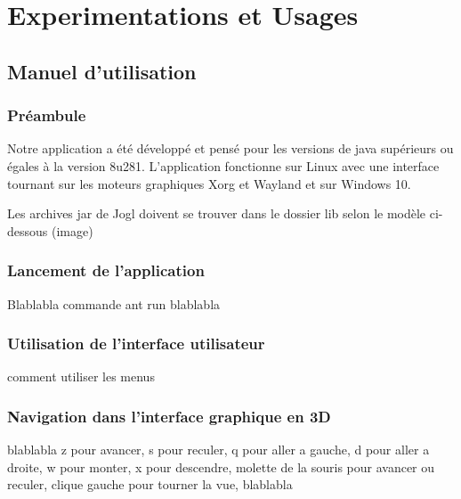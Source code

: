 \chapter{Experimentations et Usages}

\section{Manuel d'utilisation}

\subsection{Préambule}
Notre application a été développé et pensé pour les versions de java supérieurs ou égales à la version 8u281.
L'application fonctionne sur Linux avec une interface tournant sur les moteurs graphiques Xorg et Wayland et sur Windows 10.

Les archives jar de Jogl doivent se trouver dans le dossier lib selon le modèle ci-dessous (image)


\subsection{Lancement de l'application}

Blablabla commande ant run blablabla

\subsection{Utilisation de l'interface utilisateur}

comment utiliser les menus

\subsection{Navigation dans l'interface graphique en 3D}

blablabla z pour avancer, s pour reculer, q pour aller a gauche, d pour aller a droite, w pour monter, x pour descendre, molette de la souris pour avancer ou reculer, clique gauche pour tourner la vue, blablabla


